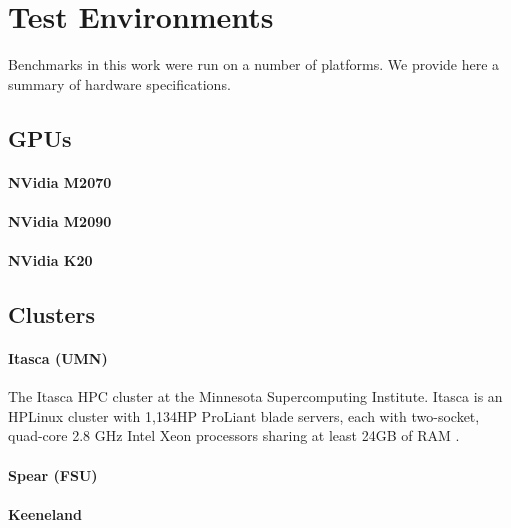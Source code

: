 

\chapter{Test Environments}

Benchmarks in this work were run on a number of platforms. We provide here a summary of hardware specifications.

\section{GPUs}


\subsubsection{NVidia M2070}

\subsubsection{NVidia M2090}

\subsubsection{NVidia K20}


\section{Clusters}

\subsubsection{Itasca (UMN)}
The Itasca HPC cluster at the Minnesota Supercomputing Institute.
Itasca is an HPLinux cluster with 1,134HP ProLiant blade servers, each with two-socket, quad-core 2.8 GHz Intel Xeon processors sharing at least 24GB of RAM \cite{MSIItasca}.

\subsubsection{Spear (FSU)}

\subsubsection{Keeneland}





